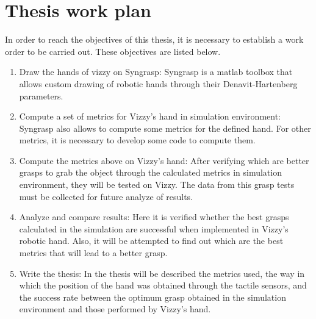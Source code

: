 
\chapter{Thesis work plan}
\label{chapter:conclusion}
In order to reach the objectives of this thesis, it is necessary to establish a work order to be carried out. These objectives are listed below.


    
\begin{enumerate}

    \item Draw the hands of vizzy on Syngrasp: Syngrasp \cite{malvezzi2013syngrasp}  is a matlab toolbox that allows custom drawing of robotic hands through their Denavit-Hartenberg parameters.
    
    \item Compute a set of metrics for Vizzy's hand in simulation environment: Syngrasp also allows to compute some metrics for the defined hand. For other metrics, it is necessary to develop some code to compute them.
    
    \item Compute the metrics above on Vizzy's hand: After verifying which are better grasps to grab the object through the calculated metrics in simulation environment, they will be tested on Vizzy. The data from this grasp tests must be collected for future analyze of results. 
    
    \item Analyze and compare results: Here it is verified whether the best grasps calculated in the simulation are successful when implemented in Vizzy's robotic hand. Also, it will be attempted to find out which are the best metrics that will lead to a better grasp.
    
    \item Write the thesis: In the thesis will be described the metrics used, the way in which the position of the hand was obtained through the tactile sensors, and the success rate between the optimum grasp obtained in the simulation environment and those performed by Vizzy's hand.
    
    
\end{enumerate}
